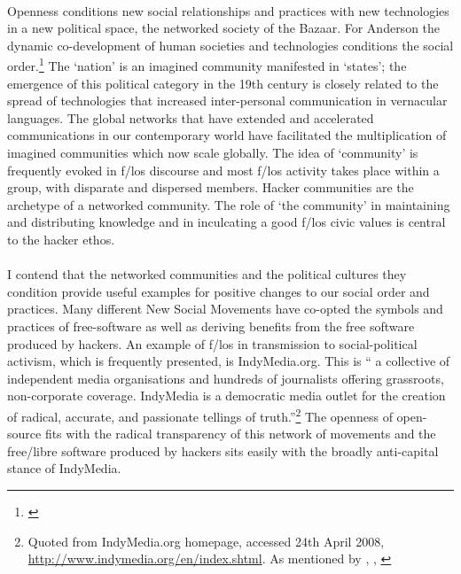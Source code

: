 \documentclass[11pt,titlepage]{book}
\begin{document}
\paragraph{}Openness conditions new social relationships and 
practices with new technologies in a new political space, the networked society of the Bazaar. For Anderson the dynamic co-development of human societies and technologies conditions the social order.\footnote{\cite{Anderson:1991ic}} The `nation' is an imagined community manifested in `states'; the emergence of this political category in the 19th century is closely related to the spread of technologies that increased inter-personal communication in vernacular languages. The global networks that have extended and accelerated communications in our contemporary world have facilitated the multiplication of imagined communities which now scale globally. The idea of `community' is frequently evoked in f/los discourse and most f/los activity takes place within a group, with disparate and dispersed members. Hacker communities are the archetype of a networked community. The role of `the community' in maintaining and distributing knowledge and in inculcating a good f/los civic values is central to the hacker ethos. 

\paragraph{}I contend that the networked communities and the political cultures they condition provide useful examples for positive changes to our social order and 
practices. Many different New Social Movements have co-opted the symbols and 
practices of free-software as well as deriving benefits from the free software produced by hackers. An example of f/los in transmission to social-political activism, which is frequently presented, is IndyMedia.org. This is `` a collective of independent media organisations and hundreds of journalists offering grassroots, non-corporate coverage. IndyMedia is a democratic media outlet for the creation of radical, accurate, and passionate tellings of truth.''\footnote{Quoted from IndyMedia.org homepage, accessed 24th April 2008, \url{http://www.indymedia.org/en/index.shtml}. As mentioned by \cite{Prug:2007fs}, \cite{Boomen:2005uq}, \cite{coleman:2004fo}} The openness of open-source fits with the radical transparency of this network of movements and the free/libre software produced by hackers sits easily with the broadly anti-capital stance of IndyMedia.
\end{document}
